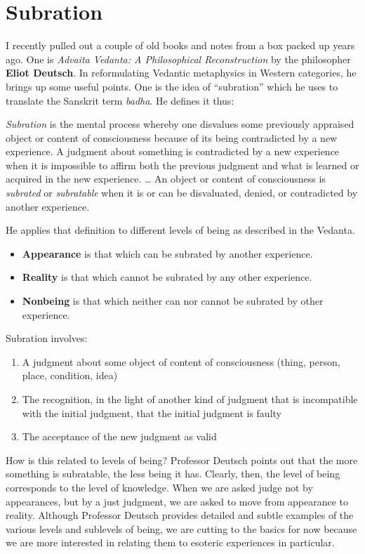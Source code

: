 \section{Subration}

I recently pulled out a couple of old books and notes from a box packed up years ago. One is \emph{Advaita Vedanta: A Philosophical Reconstruction} by the philosopher \textbf{Eliot Deutsch}. In reformulating Vedantic metaphysics in Western categories, he brings up some useful points. One is the idea of “subration” which he uses to translate the Sanskrit term \emph{badha}. He defines it thus:

\begin{quotex}
\emph{Subration} is the mental process whereby one disvalues some previously appraised object or content of consciousness because of its being contradicted by a new experience. A judgment about something is contradicted by a new experience when it is impossible to affirm both the previous judgment and what is learned or acquired in the new experience. … An object or content of consciousness is \emph{subrated} or \emph{subratable} when it is or can be disvaluated, denied, or contradicted by another experience. 

\end{quotex}
He applies that definition to different levels of being as described in the Vedanta.

\begin{itemize}
\item \textbf{Appearance} is that which can be subrated by another experience. 
\item \textbf{Reality} is that which cannot be subrated by any other experience. 
\item \textbf{Nonbeing} is that which neither can nor cannot be subrated by other experience. 
\end{itemize}
Subration involves:

\begin{enumerate}
\item A judgment about some object of content of consciousness (thing, person, place, condition, idea) 
\item The recognition, in the light of another kind of judgment that is incompatible with the initial judgment, that the initial judgment is faulty 
\item The acceptance of the new judgment as valid 
\end{enumerate}
How is this related to levels of being? Professor Deutsch points out that the more something is subratable, the less being it has. Clearly, then, the level of being corresponds to the level of knowledge. When we are asked judge not by appearances, but by a just judgment, we are asked to move from appearance to reality. Although Professor Deutsch provides detailed and subtle examples of the various levels and sublevels of being, we are cutting to the basics for now because we are more interested in relating them to esoteric experiences in particular.

